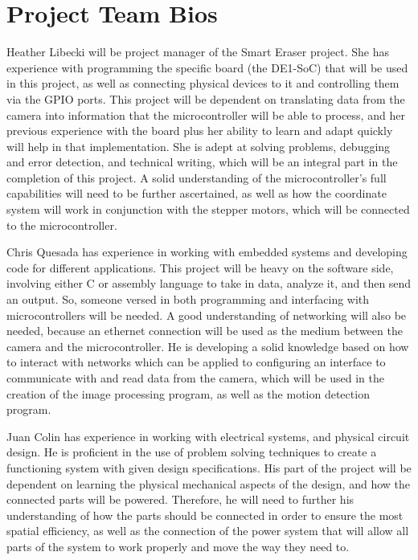 \documentclass[10pt,onecolumn,draftclsnofoot]{IEEEtran} 					%
\begin{document}
	\section{Project Team Bios}
	\setlength{\parindent}{5ex}
	Heather Libecki will be project manager of the Smart Eraser project. She has experience with programming the specific board (the DE1-SoC) that will be used in this project, as well as connecting physical devices to it and controlling them via the GPIO ports. This project will be dependent on translating data from the camera into information that the microcontroller will be able to process, and her previous experience with the board plus her ability to learn and adapt quickly will help in that implementation. She is adept at solving problems, debugging and error detection, and technical writing, which will be an integral part in the completion of this project. A solid understanding of the microcontroller{\rq}s full capabilities will need to be further ascertained, as well as how the coordinate system will work in conjunction with the stepper motors, which will be connected to the microcontroller.\par
	\setlength{\parindent}{5ex}	
	Chris Quesada has experience in working with embedded systems and developing code for different applications. This project will be heavy on the software side, involving either C or assembly language to take in data, analyze it, and then send an output. So, someone versed in both programming and interfacing with microcontrollers will be needed. A good understanding of networking will also be needed, because an ethernet connection will be used as the medium between the camera and the microcontroller. He is developing a solid knowledge based on how to interact with networks which can be applied to configuring an interface to communicate with and read data from the camera, which will be used in the creation of the image processing program, as well as the motion detection program.\par
	\setlength{\parindent}{5ex}	
	Juan Colin has experience in working with electrical systems, and physical circuit design. He is proficient in the use of problem solving techniques to create a functioning system with given design specifications. His part of the project will be dependent on learning the physical mechanical aspects of the design, and how the connected parts will be powered. Therefore, he will need to further his understanding of how the parts should be connected in order to ensure the most spatial efficiency, as well as the connection of the power system that will allow all parts of the system to work properly and move the way they need to. 
\end{document}
